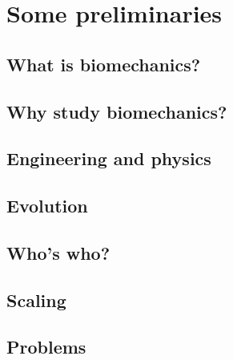 
\chapter{Some preliminaries}
\section{What is biomechanics?}
\section{Why study biomechanics?}
\section{Engineering and physics}
\section{Evolution}
\section{Who's who?}
\section{Scaling}
\section{Problems}


%
%
